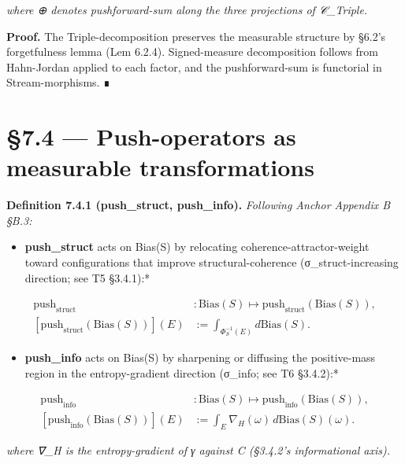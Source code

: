 \documentclass[11pt, openany]{book}
\newcommand{\sectionbreak}{\clearpage}
\begin{document}
\textit{where ⊕ denotes pushforward-sum along the three projections of 𝒞\_\allowbreak{}Triple.}

\textbf{Proof.} The Triple-decomposition preserves the measurable structure by §6.2's forgetfulness lemma (Lem 6.2.4). Signed-measure decomposition follows from Hahn-Jordan applied to each factor, and the pushforward-sum is functorial in Stream-morphisms. ∎

\sectionbreak

\section{§7.4 --- Push-operators as measurable transformations}

\textbf{Definition 7.4.1 (push\_\allowbreak{}struct, push\_\allowbreak{}info).} \textit{Following Anchor Appendix B §B.3:}

\begin{itemize}
\item \textbf{push\_\allowbreak{}struct} acts on Bias(S) by relocating coherence-attractor-weight toward configurations that improve structural-coherence (σ\_\allowbreak{}struct-increasing direction; see T5 §3.4.1):*
\end{itemize}

\[
\begin{aligned}
\mathrm{push}_\mathrm{struct} &: \mathrm{Bias}(S) \mapsto \mathrm{push}_\mathrm{struct}(\mathrm{Bias}(S)), \\
[\mathrm{push}_\mathrm{struct}(\mathrm{Bias}(S))](E) &:= \int_{\Phi_S^{-1}(E)} d\mathrm{Bias}(S).
\end{aligned}
\]

\begin{itemize}
\item \textbf{push\_\allowbreak{}info} acts on Bias(S) by sharpening or diffusing the positive-mass region in the entropy-gradient direction (σ\_\allowbreak{}info; see T6 §3.4.2):*
\end{itemize}

\[
\begin{aligned}
\mathrm{push}_\mathrm{info} &: \mathrm{Bias}(S) \mapsto \mathrm{push}_\mathrm{info}(\mathrm{Bias}(S)), \\
[\mathrm{push}_\mathrm{info}(\mathrm{Bias}(S))](E) &:= \int_E \nabla_H(\omega) \, d\mathrm{Bias}(S)(\omega).
\end{aligned}
\]

\textit{where ∇\_\allowbreak{}H is the entropy-gradient of γ against C (§3.4.2's informational axis).}
\end{document}
